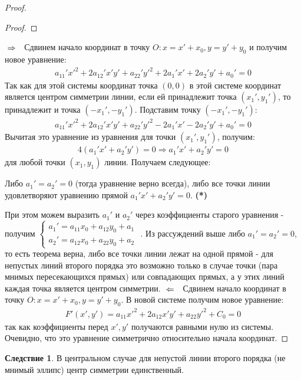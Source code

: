 \documentclass[a4paper, 12pt]{article}
\theoremstyle{definition}
\newtheorem*{consequense}{Следствие}
\begin{document}
\begin{proof}
\begin{proof}
		\end{proof}
		$\\\Rightarrow \ \ $ Сдвинем начало координат в точку $O: x = x' + x_0, y = y' + y_0$ и получим новое уравнение:
		\begin{align*}
			a_{11}'{x'}^2 + 2a_{12}'x'y' + a_{22}'{y'}^2 + 2a_{1}'x' + 2a_{2}'y' + a_{0}' = 0
		\end{align*} 
		Так как для этой системы координат точка $(0, 0)$ в этой системе координат является центром симметрии линии, если ей принадлежит точка $(x_1', y_1')$, то принадлежит и точка $(-x_1', -y_1')$. Подставим точку $(-x_1', -y_1')$:
		\begin{align*}
			a_{11}'{x'}^2 + 2a_{12}'x'y' + a_{22}'{y'}^2 - 2a_{1}'x' - 2a_{2}'y' + a_{0}' = 0
		\end{align*}
		Вычитая это уравнение из уравнения для точки $(x_1', y_1')$, получим:
		\begin{align*}
			4(a_{1}'x' + a_{2}'y') = 0 \Rightarrow a_{1}'x' + a_{2}'y' = 0
		\end{align*} 
		для любой точки $(x_1, y_1)$ линии. Получаем следующее:\begin{center}
		Либо $a_1' = a_2' = 0$ (тогда уравнение верно всегда), либо все точки линии удовлетворяют уравнению прямой $a_{1}'x' + a_{2}'y' = 0$. \bfseries(*)\mdseries
		\end{center}
		При этом можем выразить $a_1'$ и $a_2'$ через коэффициенты старого уравнения - получим $\begin{cases}
			a_1' = a_{11}x_0+a_{12}y_0+a_1\\
			a_2' = a_{12}x_0+a_{22}y_0+a_2
		\end{cases}$
		. Из рассуждений выше либо $a_1' = a_2' = 0$, то есть теорема верна, либо все точки линии лежат на одной прямой - для непустых линий второго порядка это возможно только в случае точки (пара мнимых пересекающихся прямых) или совпадающих прямых, а у этих линий каждая точка является центром симметрии.
		$\\\Leftarrow \ \ $ Сдвинем начало координат в точку $O: x = x' + x_0, y = y' + y_0$. В новой системе получим новое уравнение:
	    \begin{align*}
			F'(x', y') = a_{11}{x'}^2 + 2a_{12}x'y' + a_{22}{y'}^2 + C_0 = 0
		\end{align*}
		так как коэффициенты перед $x', y'$ получаются равными нулю из системы. Очевидно, что это уравнение симметрично относительно начала координат.
	\end{proof}
	\begin{consequense}
		В центральном случае для непустой линии второго порядка (не мнимый эллипс) центр симметрии единственный. 
	\end{consequense}
\end{document}
